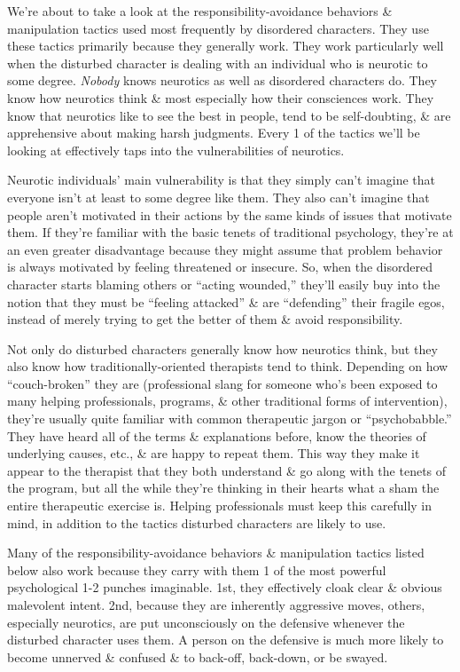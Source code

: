 \documentclass{article}
\numberwithin{equation}{section}
\begin{document}
We're about to take a look at the responsibility-avoidance behaviors \& manipulation tactics used most frequently by disordered characters. They use these tactics primarily because they generally work. They work particularly well when the disturbed character is dealing with an individual who is neurotic to some degree. \textit{Nobody} knows neurotics as well as disordered characters do. They know how neurotics think \& most especially how their consciences work. They know that neurotics like to see the best in people, tend to be self-doubting, \& are apprehensive about making harsh judgments. Every 1 of the tactics we'll be looking at effectively taps into the vulnerabilities of neurotics.

Neurotic individuals' main vulnerability is that they simply can't imagine that everyone isn't at least to some degree like them. They also can't imagine that people aren't motivated in their actions by the same kinds of issues that motivate them. If they're familiar with the basic tenets of traditional psychology, they're at an even greater disadvantage because they might assume that problem behavior is always motivated by feeling threatened or insecure. So, when the disordered character starts blaming others or ``acting wounded,'' they'll easily buy into the notion that they must be ``feeling attacked'' \& are ``defending'' their fragile egos, instead of merely trying to get the better of them \& avoid responsibility.

Not only do disturbed characters generally know how neurotics think, but they also know how traditionally-oriented therapists tend to think. Depending on how ``couch-broken'' they are (professional slang for someone who's been exposed to many helping professionals, programs, \& other traditional forms of intervention), they're usually quite familiar with common therapeutic jargon or ``psychobabble.'' They have heard all of the terms \& explanations before, know the theories of underlying causes, etc., \& are happy to repeat them. This way they make it appear to the therapist that they both understand \& go along with the tenets of the program, but all the while they're thinking in their hearts what a sham the entire therapeutic exercise is. Helping professionals must keep this carefully in mind, in addition to the tactics disturbed characters are likely to use.

Many of the responsibility-avoidance behaviors \& manipulation tactics listed below also work because they carry with them 1 of the most powerful psychological 1-2 punches imaginable. 1st, they effectively cloak clear \& obvious malevolent intent. 2nd, because they are inherently aggressive moves, others, especially neurotics, are put unconsciously on the defensive whenever the disturbed character uses them. A person on the defensive is much more likely to become unnerved \& confused \& to back-off, back-down, or be swayed.
\end{document}
